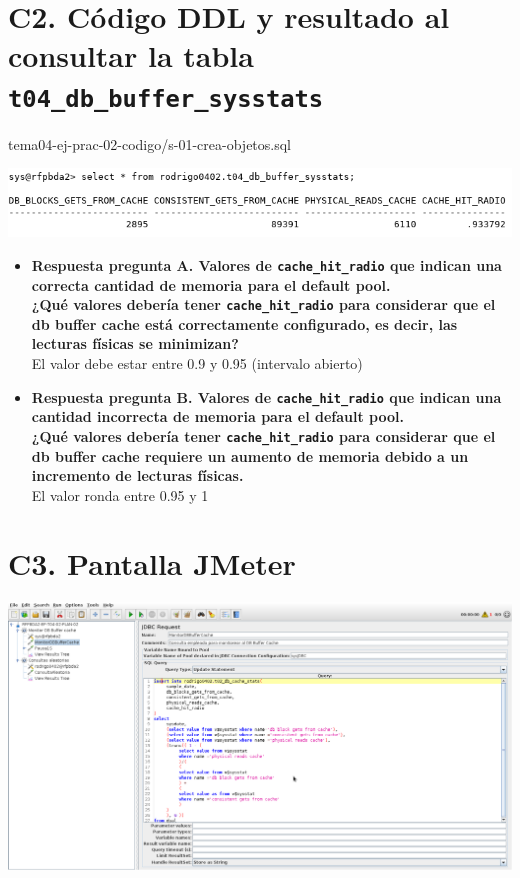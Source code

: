 \documentclass{article}
\begin{document}
\section*{C2. Código DDL y resultado al consultar la tabla
  \texttt{t04\_db\_buffer\_sysstats}}


  {tema04-ej-prac-02-codigo/s-01-crea-objetos.sql}

  \includegraphics[width=0.9\linewidth]{c2}

  \begin{itemize}
    \item \textbf{Respuesta pregunta A. Valores de \texttt{cache\_hit\_radio}
      que indican una correcta cantidad de memoria para el default pool.\\
      ¿Qué valores debería tener \texttt{cache\_hit\_radio} para considerar 
      que el db buffer cache está correctamente configurado, es decir, las 
      lecturas físicas se minimizan?} \\[2mm]
    
      El valor debe estar entre 0.9 y 0.95 (intervalo abierto)

    \item \textbf{Respuesta pregunta B. Valores de \texttt{cache\_hit\_radio}
      que indican una cantidad incorrecta de memoria para el default pool.\\
      ¿Qué valores debería tener \texttt{cache\_hit\_radio} para considerar 
      que el db buffer cache requiere un aumento de memoria debido a un 
      incremento de lecturas físicas.}\\[2mm]

      El valor ronda entre 0.95 y 1

  \end{itemize}

\section*{C3. Pantalla JMeter}

\includegraphics[width=\linewidth]{jmeter}
\end{document}
